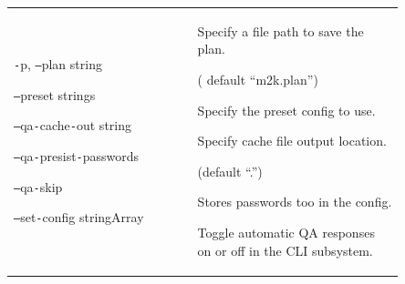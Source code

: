 \documentclass[twocolumn]{article}
\newcommand{\lightlexendfont}[1]{{\lightlexendfontfamily #1}}
\newcommand{\tfontsize}{\fontsize{6}{12}\selectfont}
\newcommand{\dash}{\texttt{-}}
\newcommand{\doubledash}{\texttt{--}}
\begin{document}
{{{\begin{table}[H]
{\begin{tabular}{|>{\tfontsize}p{0.4\linewidth}|>{\tfontsize}p{0.45\linewidth}|}
{      Overwrite the output directory if it exists. By default we don’t overwrite.}                                           \\
      \hline \dash p, \doubledash plan string

      \vspace{1.25\baselineskip}

      \hspace{0.3cm} \doubledash preset strings

      \vspace{0.25\baselineskip}

      \hspace{0.3cm} \doubledash qa\dash cache\dash out string

      \vspace{1.25\baselineskip}

      \hspace{0.3cm} \doubledash qa\dash presist\dash passwords

      \vspace{0.25\baselineskip}

      \hspace{0.3cm} \doubledash qa\dash skip

      \vspace{1.25\baselineskip}

      \hspace{0.3cm} \doubledash set\dash config stringArray       & \lightlexendfont{Specify a file path to save the plan.

        ( default “m2k.plan”)

        \vspace{0.25\baselineskip}

        Specify the preset config to use.

        \vspace{0.25\baselineskip}

        Specify cache file output location.

        (default “.”)

        \vspace{0.25\baselineskip}

        Stores passwords too in the config.

        \vspace{0.25\baselineskip}

        Toggle automatic QA responses on or off in the CLI subsystem.

        \vspace{0.25\baselineskip}

}
\end{tabular}}
\end{table}}}}
\end{document}
